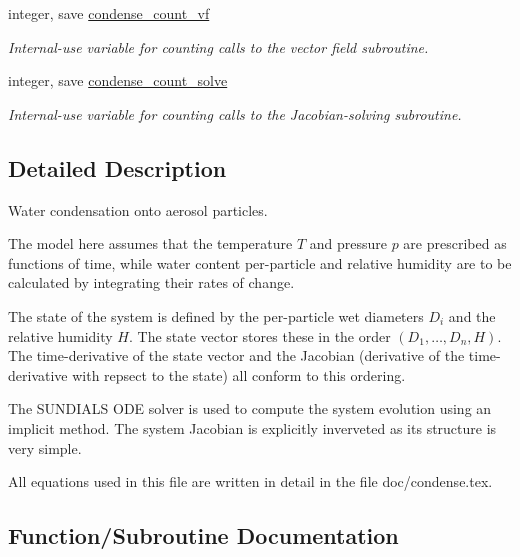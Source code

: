 \begin{DoxyCompactItemize}
integer, save \mbox{\hyperlink{namespacepmc__condense_af51c8e3d30352bcf05b09da63797f908}{condense\+\_\+count\+\_\+vf}}
\begin{DoxyCompactList}\small\item\em Internal-\/use variable for counting calls to the vector field subroutine. \end{DoxyCompactList}\item 
integer, save \mbox{\hyperlink{namespacepmc__condense_ab362439e7fd220994e7da1bd4658d21d}{condense\+\_\+count\+\_\+solve}}
\begin{DoxyCompactList}\small\item\em Internal-\/use variable for counting calls to the Jacobian-\/solving subroutine. \end{DoxyCompactList}\end{DoxyCompactItemize}


\subsection{Detailed Description}
Water condensation onto aerosol particles. 

The model here assumes that the temperature $ T $ and pressure $ p $ are prescribed as functions of time, while water content per-\/particle and relative humidity are to be calculated by integrating their rates of change.

The state of the system is defined by the per-\/particle wet diameters $ D_i $ and the relative humidity $ H $. The state vector stores these in the order $ (D_1,\ldots,D_n,H) $. The time-\/derivative of the state vector and the Jacobian (derivative of the time-\/derivative with repsect to the state) all conform to this ordering.

The S\+U\+N\+D\+I\+A\+LS O\+DE solver is used to compute the system evolution using an implicit method. The system Jacobian is explicitly inverveted as its structure is very simple.

All equations used in this file are written in detail in the file {\ttfamily doc/condense.\+tex}. 

\subsection{Function/\+Subroutine Documentation}
\mbox{\label{namespacepmc__condense_afc45edd4ee290a743c722977accc1f5c}} 
